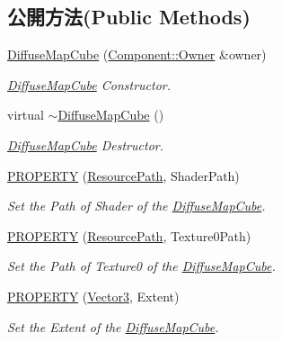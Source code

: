 \subsection*{公開方法(Public Methods)}
\begin{DoxyCompactItemize}
\item 
\hyperlink{class_i_dream_sky_1_1_diffuse_map_cube_a97484ad39262a4c9f0405a08a53c5d5a}{Diffuse\+Map\+Cube} (\hyperlink{class_i_dream_sky_1_1_component_1_1_owner}{Component\+::\+Owner} \&owner)
\begin{DoxyCompactList}\small\item\em \hyperlink{class_i_dream_sky_1_1_diffuse_map_cube}{Diffuse\+Map\+Cube} Constructor. \end{DoxyCompactList}\item 
virtual \hyperlink{class_i_dream_sky_1_1_diffuse_map_cube_af7de4ae795858e54bc969b29e48872ed}{$\sim$\+Diffuse\+Map\+Cube} ()
\begin{DoxyCompactList}\small\item\em \hyperlink{class_i_dream_sky_1_1_diffuse_map_cube}{Diffuse\+Map\+Cube} Destructor. \end{DoxyCompactList}\item 
\hyperlink{class_i_dream_sky_1_1_diffuse_map_cube_aee5348c4d885e1eb0f0601fc02a6a91d}{P\+R\+O\+P\+E\+R\+TY} (\hyperlink{class_i_dream_sky_1_1_resource_path}{Resource\+Path}, Shader\+Path)
\begin{DoxyCompactList}\small\item\em Set the Path of Shader of the \hyperlink{class_i_dream_sky_1_1_diffuse_map_cube}{Diffuse\+Map\+Cube}. \end{DoxyCompactList}\item 
\hyperlink{class_i_dream_sky_1_1_diffuse_map_cube_ae3bad7625bbbc6070f67862c1126cfc6}{P\+R\+O\+P\+E\+R\+TY} (\hyperlink{class_i_dream_sky_1_1_resource_path}{Resource\+Path}, Texture0\+Path)
\begin{DoxyCompactList}\small\item\em Set the Path of Texture0 of the \hyperlink{class_i_dream_sky_1_1_diffuse_map_cube}{Diffuse\+Map\+Cube}. \end{DoxyCompactList}\item 
\hyperlink{class_i_dream_sky_1_1_diffuse_map_cube_a7a9fe80e0fe7444b821dcd4d7deabe61}{P\+R\+O\+P\+E\+R\+TY} (\hyperlink{class_i_dream_sky_1_1_vector3}{Vector3}, Extent)
\begin{DoxyCompactList}\small\item\em Set the Extent of the \hyperlink{class_i_dream_sky_1_1_diffuse_map_cube}{Diffuse\+Map\+Cube}. \end{DoxyCompactList}\end{DoxyCompactItemize}
